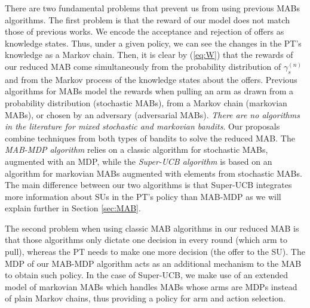 There are two fundamental problems that prevent us from using previous MABs algorithms. The first problem is that the reward of our model does not match those of previous works. We encode the acceptance and rejection of offers as knowledge states. Thus, under a given policy, we can see the changes in the PT's knowledge as a Markov chain. Then, it is clear by (\ref{eq:W}) that the rewards of our reduced MAB come simultaneously from the probability distribution of $\gamma_s^{(n)}$ and from the Markov process of the knowledge states about the offers. Previous algorithms for MABs model the rewards when pulling an arm as drawn from a probability distribution (stochastic MABs), from a Markov chain (markovian MABs), or chosen by an adversary (adversarial MABs). \textit{There are no algorithms in the literature for mixed stochastic and markovian bandits}. Our proposals combine techniques from both types of bandits to solve the reduced MAB. The \textit{MAB-MDP algorithm} relies on a classic algorithm for stochastic MABs, augmented with an MDP, while the \textit{Super-UCB algorithm} is based on an algorithm for markovian MABs augmented with elements from stochastic MABs. The main difference between our two algorithms is that Super-UCB integrates more information about SUs in the PT's policy than MAB-MDP as we will explain further in Section \ref{sec:MAB}.

The second problem when using classic MAB algorithms in our reduced MAB is that those algorithms only dictate one decision in every round (which arm to pull), whereas the PT needs to make one more decision (the offer to the SU).  The MDP of our MAB-MDP algorithm acts as an additional mechanism to the MAB to obtain such policy. In the case of Super-UCB, we make use of an extended model of markovian MABs which handles MABs whose arms are MDPs instead of plain Markov chains, thus providing a policy for arm and action selection. 


